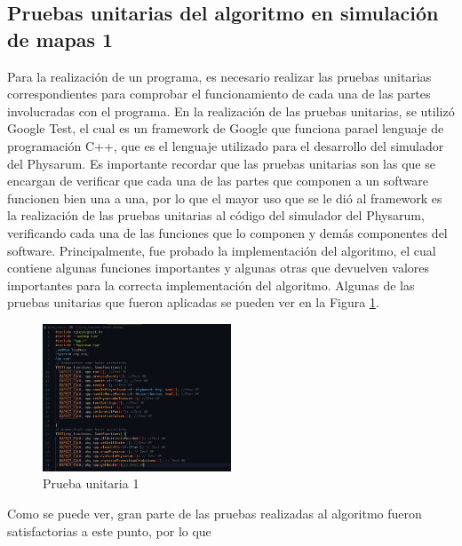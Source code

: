 \subsection{Pruebas unitarias del algoritmo en simulaci\'on de mapas 1} %
\label{sub:subsection name1}
    Para la realizaci\'on de un programa, es necesario realizar las
        pruebas unitarias correspondientes para comprobar el
        funcionamiento de cada una de las partes involucradas con el
        programa.
    \vskip 0.5cm
    En la realizaci\'on de las pruebas unitarias, se utiliz\'o Google
        Test, el cual es un framework de Google que funciona parael lenguaje de programaci\'on C++, que es el lenguaje
        utilizado para el desarrollo del simulador del Physarum. Es
        importante recordar que las pruebas unitarias son las que se
        encargan de verificar que cada una de las partes que
        componen a un software funcionen bien una a una, por lo
        que el mayor uso que se le di\'o al framework es la realizaci\'on
        de las pruebas unitarias al c\'odigo del simulador del
        Physarum, verificando cada una de las funciones que lo
        componen y dem\'as componentes del software.
    \vskip 0.5cm
    Principalmente, fue probado la implementaci\'on del
        algoritmo, el cual contiene algunas funciones importantes y
        algunas otras que devuelven valores importantes para la
        correcta implementaci\'on del algoritmo.
    \vskip 0.5cm
    Algunas de las pruebas unitarias que fueron aplicadas se pueden
        ver en la Figura \ref{fig:Prueba unitaria 1}.
    \vskip 0.5cm
    \begin{figure}[htbp]
        \centering
        \includegraphics[width=0.5\textwidth]{./images/Pruebas/simulador/image007.png}
        \caption{Prueba unitaria 1}
        \label{fig:Prueba unitaria 1}
    \end{figure}
    \vskip 0.5cm
    Como se puede ver, gran parte de las pruebas realizadas al
        algoritmo fueron satisfactorias a este punto, por lo que

